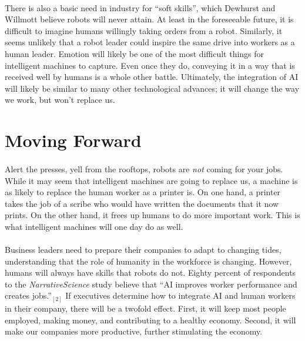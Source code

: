 \documentclass{article}
\begin{document}
    \paragraph{}
      There is also a basic need in industry for “soft skills”, which Dewhurst and Willmott
      believe robots will never attain. At least in the foreseeable future, it
      is difficult to imagine humans willingly taking orders from a robot.
      Similarly, it seems unlikely that a robot leader could inspire the same
      drive into workers as a human leader. Emotion will likely be one of the
      most difficult things for intelligent machines to capture. Even once they
      do, conveying it in a way that is received well by humans is a whole other
      battle. Ultimately, the integration of AI will likely be similar to many
      other technological advances; it will change the way we work, but won't
      replace us.

  \section{Moving Forward}
    \paragraph{}
      Alert the presses, yell from the rooftops, robots are \textit{not} coming
      for your jobs. While it may seem that intelligent machines are going to
      replace us, a machine is as likely to replace the human worker as a printer
      is. On one hand, a printer takes the job of a scribe who would have written the
      documents that it now prints. On the other hand, it frees up humans to
      do more important work. This is what intelligent machines will one day
      do as well.

    \paragraph{}
      Business leaders need to prepare their companies to adapt to
      changing tides, understanding that the role of humanity in the workforce
      is changing. However, humans will always have skills that robots do not.
      Eighty percent of respondents to the \textit{NarrativeScience} study believe
      that ``AI improves worker performance and creates jobs.''$_{[2]}$ If
      executives determine how to integrate AI and human workers in their company,
      there will be a twofold effect. First, it will keep
      most people employed, making money, and contributing to a healthy economy.
      Second, it will make our companies more productive, further stimulating the
      economy.
\end{document}
